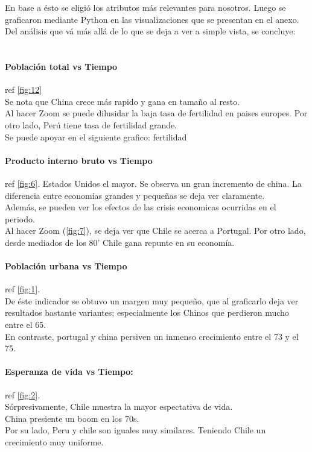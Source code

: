 \documentclass{article}
\begin{document}
En base a ésto se eligió los atributos más relevantes para nosotros. Luego se graficaron mediante Python en las visualizaciones que se presentan en el anexo.\\

Del análisis que vá más allá de lo que se deja a ver a simple vista, se concluye:\\
\\
\paragraph{Población total vs Tiempo}
ref \ref{fig:12}\\
Se nota que China crece más rapido y gana en tamaño al resto.\\

Al hacer Zoom se puede dilusidar la baja tasa de fertilidad en paises europes. Por otro lado, Perú tiene tasa de fertilidad grande. \\
Se puede apoyar en el siguiente grafico: fertilidad

\paragraph{Producto interno bruto vs Tiempo}
ref \ref{fig:6}.
Estados Unidos el mayor. Se observa un gran incremento de china.
La diferencia entre economías grandes y pequeñas se deja ver claramente.\\

Además, se pueden ver los efectos de las crisis economicas ocurridas en el periodo.\\

Al hacer Zoom (\ref{fig:7}), se deja ver que Chile se acerca a Portugal. Por otro lado, desde mediados de los 80' Chile gana repunte en su economía.

\paragraph{Población urbana vs Tiempo}
ref \ref{fig:1}.\\
De éste indicador se obtuvo un margen muy pequeño, que al graficarlo deja ver resultados bastante variantes; especialmente los Chinos que perdieron mucho entre el 65.\\
En contraste, portugal y china persiven un inmenso crecimiento entre el 73 y el 75.\\


\paragraph{Esperanza de vida vs Tiempo:}
ref \ref{fig:2}.\\
Sórpresivamente, Chile muestra la mayor espectativa de vida.\\
China presiente un boom en los 70s.\\
Por su lado, Peru y chile son iguales muy similares. Teniendo Chile un crecimiento muy uniforme.\\
\end{document}
